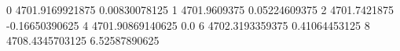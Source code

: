 0 4701.9169921875 0.00830078125
1 4701.9609375 0.05224609375
2 4701.7421875 -0.16650390625
4 4701.90869140625 0.0
6 4702.3193359375 0.41064453125
8 4708.4345703125 6.52587890625
